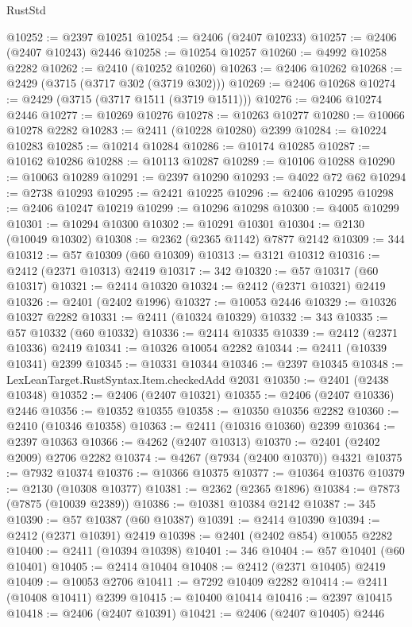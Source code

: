 \begin{lexlean}{RustStd}
\begin{coremodule}
@10252 := @2397 @10251
@10254 := @2406 (@2407 @10233)
@10257 := @2406 (@2407 @10243) @2446
@10258 := @10254 @10257
@10260 := @4992 @10258 @2282
@10262 := @2410 (@10252 @10260)
@10263 := @2406 @10262
@10268 := @2429 (@3715 (@3717 @302 (@3719 @302)))
@10269 := @2406 @10268
@10274 := @2429 (@3715 (@3717 @1511 (@3719 @1511)))
@10276 := @2406 @10274 @2446
@10277 := @10269 @10276
@10278 := @10263 @10277
@10280 := @10066 @10278 @2282
@10283 := @2411 (@10228 @10280) @2399
@10284 := @10224 @10283
@10285 := @10214 @10284
@10286 := @10174 @10285
@10287 := @10162 @10286
@10288 := @10113 @10287
@10289 := @10106 @10288
@10290 := @10063 @10289
@10291 := @2397 @10290
@10293 := @4022 @72 @62
@10294 := @2738 @10293
@10295 := @2421 @10225
@10296 := @2406 @10295
@10298 := @2406 @10247 @10219
@10299 := @10296 @10298
@10300 := @4005 @10299
@10301 := @10294 @10300
@10302 := @10291 @10301
@10304 := @2130 (@10049 @10302)
@10308 := @2362 (@2365 @1142) @7877 @2142
@10309 := 344
@10312 := @57 @10309 (@60 @10309)
@10313 := @3121 @10312
@10316 := @2412 (@2371 @10313) @2419
@10317 := 342
@10320 := @57 @10317 (@60 @10317)
@10321 := @2414 @10320
@10324 := @2412 (@2371 @10321) @2419
@10326 := @2401 (@2402 @1996)
@10327 := @10053 @2446
@10329 := @10326 @10327 @2282
@10331 := @2411 (@10324 @10329)
@10332 := 343
@10335 := @57 @10332 (@60 @10332)
@10336 := @2414 @10335
@10339 := @2412 (@2371 @10336) @2419
@10341 := @10326 @10054 @2282
@10344 := @2411 (@10339 @10341) @2399
@10345 := @10331 @10344
@10346 := @2397 @10345
@10348 := LexLeanTarget.RustSyntax.Item.checkedAdd @2031
@10350 := @2401 (@2438 @10348)
@10352 := @2406 (@2407 @10321)
@10355 := @2406 (@2407 @10336) @2446
@10356 := @10352 @10355
@10358 := @10350 @10356 @2282
@10360 := @2410 (@10346 @10358)
@10363 := @2411 (@10316 @10360) @2399
@10364 := @2397 @10363
@10366 := @4262 (@2407 @10313)
@10370 := @2401 (@2402 @2009) @2706 @2282
@10374 := @4267 (@7934 (@2400 @10370)) @4321
@10375 := @7932 @10374
@10376 := @10366 @10375
@10377 := @10364 @10376
@10379 := @2130 (@10308 @10377)
@10381 := @2362 (@2365 @1896)
@10384 := @7873 (@7875 (@10039 @2389))
@10386 := @10381 @10384 @2142
@10387 := 345
@10390 := @57 @10387 (@60 @10387)
@10391 := @2414 @10390
@10394 := @2412 (@2371 @10391) @2419
@10398 := @2401 (@2402 @854) @10055 @2282
@10400 := @2411 (@10394 @10398)
@10401 := 346
@10404 := @57 @10401 (@60 @10401)
@10405 := @2414 @10404
@10408 := @2412 (@2371 @10405) @2419
@10409 := @10053 @2706
@10411 := @7292 @10409 @2282
@10414 := @2411 (@10408 @10411) @2399
@10415 := @10400 @10414
@10416 := @2397 @10415
@10418 := @2406 (@2407 @10391)
@10421 := @2406 (@2407 @10405) @2446

\end{coremodule}
\end{lexlean}
